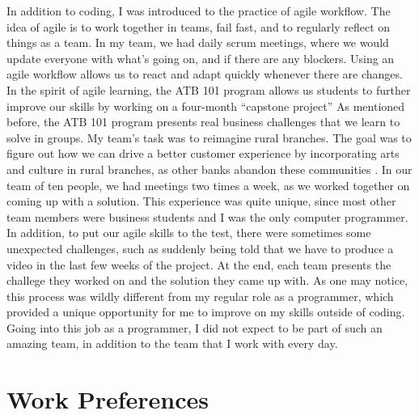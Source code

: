 \documentclass[letterpaper,12pt]{article}
\begin{document}
In addition to coding, I was introduced to the practice of agile workflow. The idea of agile is to work together
in teams, fail fast, and to regularly reflect on things as a team.\cite{agile}
In my team, we had daily scrum meetings, where we would update everyone with
what's going on, and if there are any blockers. Using an agile workflow allows us to react and adapt
quickly whenever there are changes. In the spirit of agile learning, the ATB 101
program allows us students to further improve our skills by working on a four-month ``capstone project''
As mentioned before, the ATB 101 program presents real business challenges that we learn to
solve in groups. My team's task was to reimagine rural branches. The goal was to figure out
how we can drive a better customer experience by incorporating arts and culture in rural branches,
as other banks abandon these communities \cite{saskbranches}. In our team of ten people,
we had meetings two times a week, as we worked together on coming up with a solution.
This experience was quite unique, since most other team members were business students and
I was the only computer programmer. In addition, to put our agile skills to the test,
there were sometimes some unexpected challenges, such as suddenly being told that we have to produce
a video in the last few weeks of the project.
At the end, each team presents the challege they worked on and the solution they came up with.
As one may notice, this process was wildly different from my regular role as a programmer, which
provided a unique opportunity for me to improve on my skills outside of coding. Going into
this job as a programmer, I did not expect to be part of such an amazing team, in addition to
the team that I work with every day.



\section{Work Preferences}
\end{document}
